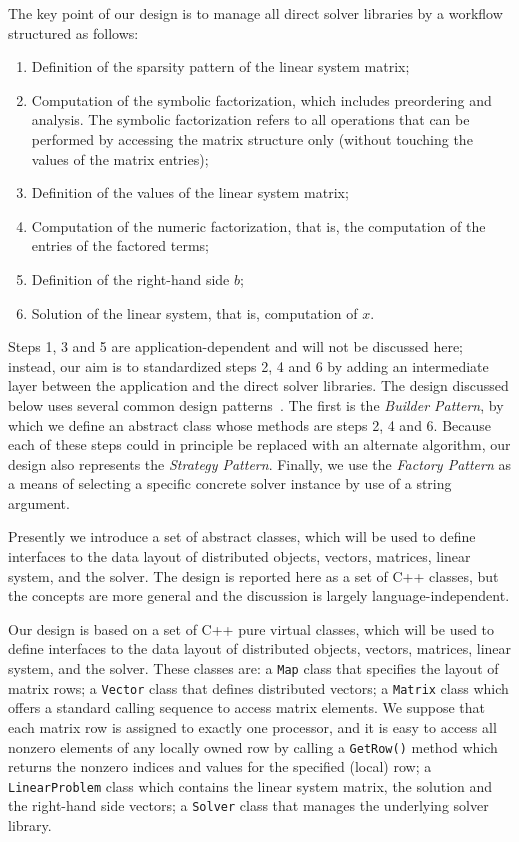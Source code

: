 \documentclass{llncs}
\begin{document}
The key point of our design is to manage all direct solver libraries by a
workflow structured as follows:
\begin{enumerate}
\item Definition of the sparsity pattern of the linear system matrix;
\item Computation of the symbolic factorization, which includes
preordering and analysis. The
symbolic factorization refers to all operations that can be performed by
accessing the matrix structure only (without touching the values of the matrix entries);
\item Definition of the values of the linear system matrix;
\item Computation of the numeric factorization, that is, the computation
of the entries of the factored terms;
\item Definition of the right-hand side $b$;
\item Solution of the linear system, that is, computation of $x$.
\end{enumerate}
Steps 1, 3 and 5 are application-dependent and will not be discussed
here; instead, our aim is to standardized steps 2, 4 and
6  by adding an intermediate layer between the application and
the direct solver libraries.  The design discussed below uses
several common design patterns~\cite{Gamma}.  The first is the
\textit{Builder Pattern}, by which we define an abstract class whose
methods are steps 2, 4 and 6.  Because each of these steps could in
principle be replaced with an alternate algorithm, our design also
represents the \textit{Strategy Pattern}. Finally, we use the
\textit{Factory Pattern} as a means of selecting a specific concrete
solver instance by use of a string argument.

Presently we introduce a set of abstract classes, which will be used
to define interfaces to the data layout of distributed objects,
vectors, matrices, linear system, and the solver. The design is
reported here as a set of C++ classes, but the concepts are more
general and the discussion is largely language-independent.

Our design is based on a set of C++ pure virtual classes, which will be
used to define interfaces to the data layout of distributed objects, 
vectors, matrices, linear system, and the solver. These classes are:
a {\tt Map} class that specifies the layout of matrix rows;
a {\tt Vector} class that defines distributed vectors;
a {\tt Matrix} class which offers a standard calling sequence to access
matrix elements. We suppose that each matrix row is assigned to exactly one
processor, and it is easy to access all nonzero elements
of any locally owned row by calling a {\tt GetRow()} method which returns the
nonzero indices and values for the specified (local) row;
a {\tt LinearProblem} class which contains the linear system matrix, the
solution and the right-hand side vectors;
a {\tt Solver} class that manages the underlying solver library. 
\end{document}
